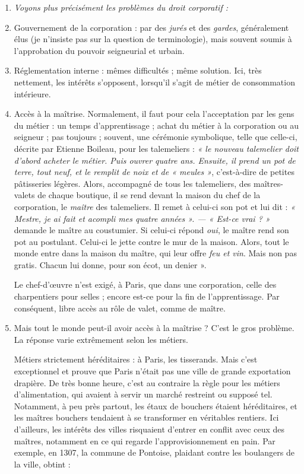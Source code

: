 \documentclass[french,twoside]{book} %
\newlength{\listmod}
\newcommand{\listhead}[1]{\hspace{-1\listmod}\emph{#1}}
\begin{document}
\begin{enumerate}[itemsep=\baselineskip,]
\item[]\listhead{Voyons plus précisément les problèmes du droit corporatif :}
\item Gouvernement de la corporation : par des \emph{jurés} et des \emph{gardes}, généralement élus (je n’insiste pas sur la question de terminologie), mais souvent soumis à l’approbation du pouvoir seigneurial et urbain.
\item Réglementation interne : mêmes difficultés ; même solution. Ici, très nettement, les intérêts s’opposent, lorsqu’il s’agit de métier de consommation intérieure.
\item Accès à la maîtrise. Normalement, il faut pour cela l’acceptation par les gens du métier : un temps d’apprentissage ; achat du métier à la corporation ou au seigneur ; pas toujours ; souvent, une cérémonie symbolique, telle que celle-ci, décrite par Etienne Boileau, pour les talemeliers : \emph{« le nouveau talemelier doit d’abord acheter le métier. Puis ouvrer quatre ans. Ensuite, il prend un pot de terre, tout neuf, et le remplit de noix et de « meules »}, c’est-à-dire de petites pâtisseries légères. Alors, accompagné de tous les talemeliers, des maîtres-valets de chaque boutique, il se rend devant la maison du chef de la corporation, le \emph{maître} des talemeliers. Il remet à celui-ci son pot et lui dit : \emph{« Mestre, je ai fait et acompli mes quatre années ». — « Est-ce vrai ? »} demande le maître au coustumier. Si celui-ci répond \emph{oui}, le maître rend son pot au postulant. Celui-ci le jette contre le mur de la maison. Alors, tout le monde entre dans la maison du maître, qui leur offre \emph{feu et vin}. Mais non pas gratis. Chacun lui donne, pour son écot, un denier ».\par
Le chef-d’œuvre n’est exigé, à Paris, que dans une corporation, celle des charpentiers pour selles ; encore est-ce pour la fin de l’apprentissage. Par conséquent, libre accès au rôle de valet, comme de maître.

\item Mais tout le monde peut-il avoir accès à la maîtrise ? C’est le gros problème. La réponse varie extrêmement selon les métiers.\par
Métiers strictement héréditaires : à Paris, les tisserands. Mais c’est exceptionnel et prouve que Paris n’était pas une ville de grande exportation drapière. De très bonne heure, c’est au contraire la règle pour les métiers d’alimentation, qui avaient à servir un marché restreint ou supposé tel. Notamment, à peu près partout, les étaux de bouchers étaient héréditaires, et les maîtres bouchers tendaient à se transformer en véritables rentiers. Ici d’ailleurs, les intérêts des villes risquaient d’entrer en conflit avec ceux des maîtres, notamment en ce qui regarde l’approvisionnement en pain. Par exemple, en 1307, la commune de Pontoise, plaidant contre les boulangers de la ville, obtint :\par


\end{enumerate}
\end{document}
